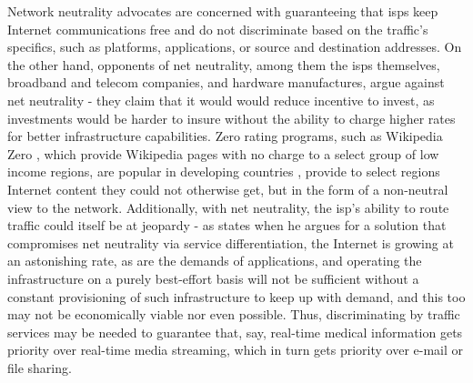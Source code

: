     Network neutrality advocates are concerned with guaranteeing that \glspl{isp} keep Internet communications free and do not discriminate based on the traffic's specifics, such as platforms, applications, or source and destination addresses.
    On the other hand, opponents of net neutrality, among them the \glspl{isp} themselves, broadband and telecom companies, and hardware manufactures, argue against net neutrality - they claim that it would would reduce incentive to invest, as investments would be harder to insure without the ability to charge higher rates for better infrastructure capabilities.
    Zero rating programs, such as Wikipedia Zero \cite{wikipedia-zero}, which provide Wikipedia \cite{wikipedia} pages with no charge to a select group of low income regions, are popular in developing countries \cite{network-neutrality-developing} , provide to select regions Internet content they could not otherwise get, but in the form of a non-neutral view to the network.
    Additionally, with net neutrality, the \gls{isp}'s ability to route traffic could itself be at jeopardy - as \cite{qos-aware} states when he argues for a solution that compromises net neutrality via service differentiation, the Internet is growing at an astonishing rate, as are the demands of applications, and operating the infrastructure on a purely best-effort basis will not be sufficient without a constant provisioning of such infrastructure to keep up with demand, and this too may not be economically viable nor even possible.
    Thus, discriminating by traffic services may be needed to guarantee that, say, real-time medical information gets priority over real-time media streaming, which in turn gets priority over e-mail or file sharing.

